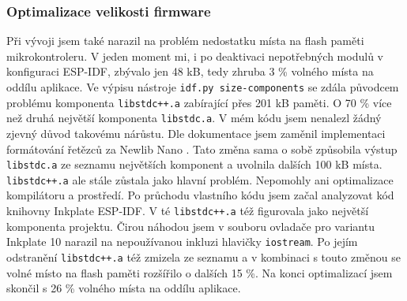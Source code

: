 \subsubsection{Optimalizace velikosti firmware} Při vývoji jsem také narazil na problém nedostatku místa na flash paměti mikrokontroleru. V jeden moment mi, i po deaktivaci nepotřebných modulů v konfiguraci ESP-IDF, zbývalo jen 48 kB, tedy zhruba 3 \% volného místa na oddílu aplikace. Ve výpisu nástroje \lstinline|idf.py size-components| se zdála původcem problému komponenta \lstinline|libstdc++.a| zabírající přes 201 kB paměti. O 70 \% více než druhá největší komponenta \lstinline|libstdc.a|. V mém kódu jsem nenalezl žádný zjevný důvod takovému nárůstu. Dle dokumentace jsem zaměnil implementaci formátování řetězců za Newlib Nano \cite{MinimizingBinarySize}. Tato změna sama o sobě způsobila výstup \lstinline|libstdc.a| ze seznamu největších komponent a uvolnila dalších 100 kB místa. \lstinline|libstdc++.a| ale stále zůstala jako hlavní problém. Nepomohly ani optimalizace kompilátoru a prostředí. Po průchodu vlastního kódu jsem začal analyzovat kód knihovny Inkplate ESP-IDF. V té \lstinline|libstdc++.a| též figurovala jako největší komponenta projektu. Čirou náhodou jsem v souboru ovladače pro variantu Inkplate 10 narazil na nepoužívanou inkluzi hlavičky \lstinline|iostream|. Po jejím odstranění \lstinline|libstdc++.a| též zmizela ze seznamu a v kombinaci s touto změnou se volné místo na flash paměti rozšířilo o dalších 15 \%. Na konci optimalizací jsem skončil s 26 \% volného místa na oddílu aplikace.
